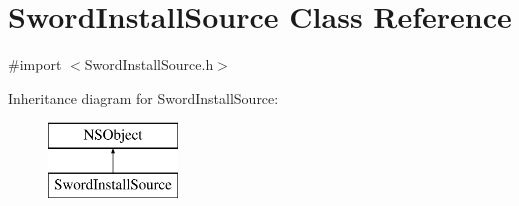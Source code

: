 \hypertarget{interface_sword_install_source}{\section{Sword\-Install\-Source Class Reference}
\label{interface_sword_install_source}
}


{\ttfamily \#import $<$Sword\-Install\-Source.\-h$>$}

Inheritance diagram for Sword\-Install\-Source\-:\begin{figure}[H]
\begin{center}
\leavevmode
\includegraphics[height=2.000000cm]{interface_sword_install_source}
\end{center}
\end{figure}
